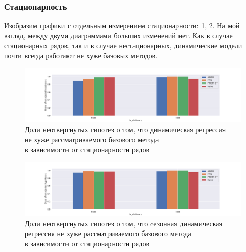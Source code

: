 \documentclass[a4paper,14pt]{extarticle}
\begin{document}
	\subsubsection{Стационарность}
	Изобразим графики с отдельным измерением стационарности: \ref{results:dynreg:stationary}, \ref{results:seasdynreg:stationary}. На мой взгляд, между двумя диаграммами больших изменений нет. Как в случае стационарных рядов, так и в случае нестационарных, динамические модели почти всегда работают не хуже базовых методов.
	\begin{figure}[!h]
		\captionsetup{justification=centering}
		\centering
		\includegraphics[width=\linewidth]{pictures/results-dynreg-stationarity.pdf}
		\caption{Доли неотвергнутых гипотез о том, что динамическая регрессия \\ не хуже рассматриваемого базового метода \\ в зависимости от стационарности рядов}
		\label{results:dynreg:stationary}
	\end{figure}
	\begin{figure}[!h]
		\captionsetup{justification=centering}
		\centering
		\includegraphics[width=\linewidth]{pictures/results-seasdynreg-stationarity.pdf}
		\caption{Доли неотвергнутых гипотез о том, что cезонная динамическая регрессия не хуже рассматриваемого базового метода \\ в зависимости от стационарности рядов}
		\label{results:seasdynreg:stationary}
	\end{figure}
\end{document}
